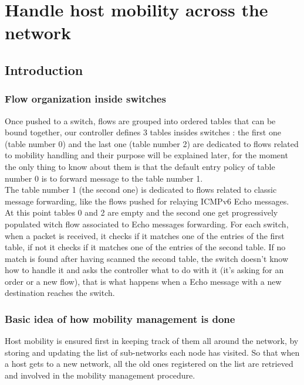 \documentclass{article}
\begin{document}
\section{Handle host mobility across the network}

\subsection{Introduction}

\subsubsection{Flow organization inside switches}
Once pushed to a switch, flows are grouped into ordered tables that
can be bound together, our controller defines 3 tables insides
switches : the first one (table number 0) and the last one (table
number 2) are dedicated to flows related to mobility handling and
their purpose will be explained later, for the moment the only thing
to know about them is that the default entry policy of table number 0
is to forward message to the table number 1.\\
\newline
The table number 1 (the second one) is dedicated to flows related to
classic message forwarding, like the flows pushed for relaying ICMPv6
Echo messages. At this point tables 0 and 2 are empty and the second
one get progressively populated witch flow associated to Echo messages
forwarding. For each switch, when a packet is received, it checks if
it matches one of the entries of the first table, if not it checks if
it matches one of the entries of the second table. If no match is
found after having scanned the second table, the switch doesn't know
how to handle it and asks the controller what to do with it (it's
asking for an order or a new flow), that is what happens when a Echo
message with a new destination reaches the switch.

\subsubsection{Basic idea of how mobility management is done}

Host mobility is ensured first in keeping track of them all around the
network, by storing and updating the list of sub-networks each node
has visited. So that when a host gets to a new network, all the old
ones registered on the list are retrieved and involved in the mobility
management procedure.
\end{document}
